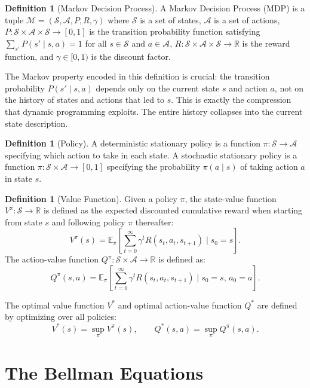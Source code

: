 \documentclass[12pt, a4paper, openany]{book}
\theoremstyle{plain}
\theoremstyle{definition}
\newtheorem{definition}[theorem]{Definition}
\theoremstyle{remark}
\begin{document}
\begin{definition}[Markov Decision Process]
A Markov Decision Process (MDP) is a tuple $\mathcal{M} = (\mathcal{S}, \mathcal{A}, P, R, \gamma)$ where $\mathcal{S}$ is a set of states, $\mathcal{A}$ is a set of actions, $P: \mathcal{S} \times \mathcal{A} \times \mathcal{S} \to [0,1]$ is the transition probability function satisfying $\sum_{s'} P(s' \mid s, a) = 1$ for all $s \in \mathcal{S}$ and $a \in \mathcal{A}$, $R: \mathcal{S} \times \mathcal{A} \times \mathcal{S} \to \mathbb{R}$ is the reward function, and $\gamma \in [0,1)$ is the discount factor.
\end{definition}

The Markov property encoded in this definition is crucial: the transition probability $P(s' \mid s, a)$ depends only on the current state $s$ and action $a$, not on the history of states and actions that led to $s$. This is exactly the compression that dynamic programming exploits. The entire history collapses into the current state description.

\begin{definition}[Policy]
A deterministic stationary policy is a function $\pi: \mathcal{S} \to \mathcal{A}$ specifying which action to take in each state. A stochastic stationary policy is a function $\pi: \mathcal{S} \times \mathcal{A} \to [0,1]$ specifying the probability $\pi(a \mid s)$ of taking action $a$ in state $s$.
\end{definition}

\begin{definition}[Value Function]
Given a policy $\pi$, the state-value function $V^\pi: \mathcal{S} \to \mathbb{R}$ is defined as the expected discounted cumulative reward when starting from state $s$ and following policy $\pi$ thereafter:
\[
V^\pi(s) = \mathbb{E}_\pi\!\left[\sum_{t=0}^\infty \gamma^t R(s_t, a_t, s_{t+1}) \;\Big|\; s_0 = s\right].
\]
The action-value function $Q^\pi: \mathcal{S} \times \mathcal{A} \to \mathbb{R}$ is defined as:
\[
Q^\pi(s,a) = \mathbb{E}_\pi\!\left[\sum_{t=0}^\infty \gamma^t R(s_t, a_t, s_{t+1}) \;\Big|\; s_0 = s,\, a_0 = a\right].
\]
\end{definition}

The optimal value function $V^*$ and optimal action-value function $Q^*$ are defined by optimizing over all policies:
\[
V^*(s) = \sup_\pi V^\pi(s), \qquad Q^*(s,a) = \sup_\pi Q^\pi(s,a).
\]

\section{The Bellman Equations}
\end{document}
